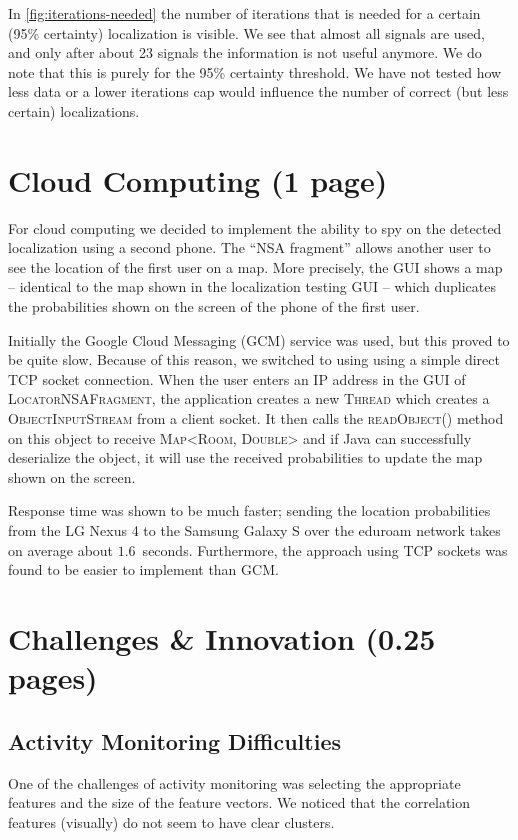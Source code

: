 \documentclass[a4paper,10pt,twoside]{IEEEtran}
\begin{document}
In \autoref{fig:iterations-needed} the number of iterations that is needed for a certain (95\% certainty) localization is visible.
We see that almost all signals are used, and only after about 23 signals the information is not useful anymore.
We do note that this is purely for the 95\% certainty threshold.
We have not tested how less data or a lower iterations cap would influence the number of correct (but less certain) localizations.

\section{Cloud Computing (1 page)}
\label{sec:cloud-computing}
For cloud computing we decided to implement the ability to spy on the detected localization using a second phone. The ``NSA fragment'' allows another user to see the location of the first user on a map. More precisely, the GUI shows a map -- identical to the map shown in the localization testing GUI -- which duplicates the probabilities shown on the screen of the phone of the first user.

Initially the Google Cloud Messaging (GCM) service was used, but this proved to be quite slow. Because of this reason, we switched to using using a simple direct TCP socket connection. When the user enters an IP address in the GUI of \textsc{LocatorNSAFragment}, the application creates a new \textsc{Thread} which creates a \textsc{ObjectInputStream} from a client socket. It then calls the \textsc{readObject()} method on this object to receive \textsc{Map<Room, Double>} and if Java can successfully deserialize the object, it will use the received probabilities to update the map shown on the screen.

Response time was shown to be much faster; sending the location probabilities from the LG Nexus 4 to the Samsung Galaxy S over the eduroam network takes on average about $1.6$~seconds. Furthermore, the approach using TCP sockets was found to be easier to implement than GCM.

\section{Challenges \& Innovation (0.25 pages)}
\label{sec:innovation}
\subsection{Activity Monitoring Difficulties}
One of the challenges of activity monitoring was selecting the appropriate features and the size of the feature vectors.
We noticed that the correlation features (visually) do not seem to have clear clusters.
\end{document}
